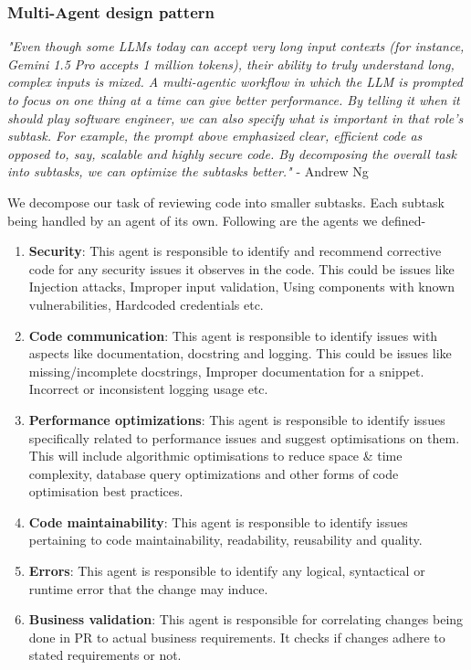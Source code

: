 \subsubsection{Multi-Agent design pattern}
\textit{"Even though some LLMs today can accept very long input contexts (for instance, Gemini 1.5 Pro accepts 1 million tokens), their ability to truly understand long, complex inputs is mixed. A multi-agentic workflow in which the LLM is prompted to focus on one thing at a time can give better performance. By telling it when it should play software engineer, we can also specify what is important in that role's subtask. For example, the prompt above emphasized clear, efficient code as opposed to, say, scalable and highly secure code. By decomposing the overall task into subtasks, we can optimize the subtasks better."} - Andrew Ng \cite{deeplearningAgenticDesign}

We decompose our task of reviewing code into smaller subtasks. Each subtask being handled by an agent of its own. \cite{qian2024chatdevcommunicativeagentssoftware} Following are the agents we defined-

\begin{enumerate}
    \item \textbf{Security}: This agent is responsible to identify and recommend corrective code for any security issues it observes in the code. This could be issues like Injection attacks, Improper input validation, Using components with known vulnerabilities, Hardcoded credentials etc.
    \item \textbf{Code communication}: This agent is responsible to identify issues with aspects like documentation, docstring and logging. This could be issues like missing/incomplete docstrings, Improper documentation for a snippet. Incorrect or inconsistent logging usage etc.
    \item \textbf{Performance optimizations}: This agent is responsible to identify issues specifically related to performance issues and suggest optimisations on them. This will include algorithmic optimisations to reduce space \& time complexity, database query optimizations and other forms of code optimisation best practices.
    \item \textbf{Code maintainability}: This agent is responsible to identify issues pertaining to code maintainability, readability, reusability and quality.
    \item \textbf{Errors}: This agent is responsible to identify any logical, syntactical or runtime error that the change may induce.
    \item \textbf{Business validation}: This agent is responsible for correlating changes being done in PR to actual business requirements. It checks if changes adhere to stated requirements or not.
\end{enumerate}

